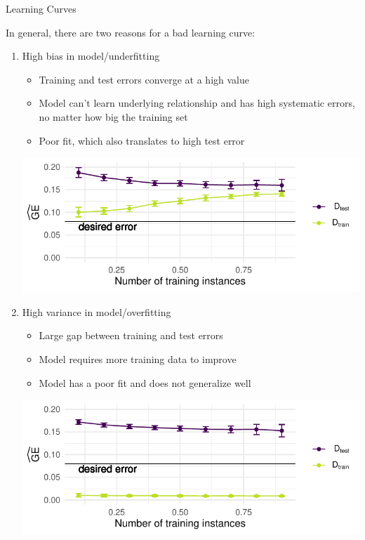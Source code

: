 \begin{frame}[c,allowframebreaks]{Learning Curves}
    \framebreak

    In general, there are two reasons for a bad learning curve:

    \begin{enumerate}
    \item High bias in model/underfitting
    \begin{itemize}
    \item Training and test errors converge at a high value
    \item Model can't learn underlying relationship and has high systematic errors, no matter how big the training set
    \item Poor fit, which also translates to high test error
    \end{itemize}

    \begin{center}
    \includegraphics[width=.7\textwidth]{learning-curve-underfitting}
    \end{center}

    \framebreak

    \item High variance in model/overfitting
    \begin{itemize}
    \item Large gap between training and test errors
    \item Model requires more training data to improve
    \item Model has a poor fit and does not generalize well
    \end{itemize}

    \begin{center}
    \includegraphics[width=.7\textwidth]{learning-curve-overfitting}
    \end{center}

    \end{enumerate}
    \end{frame}


